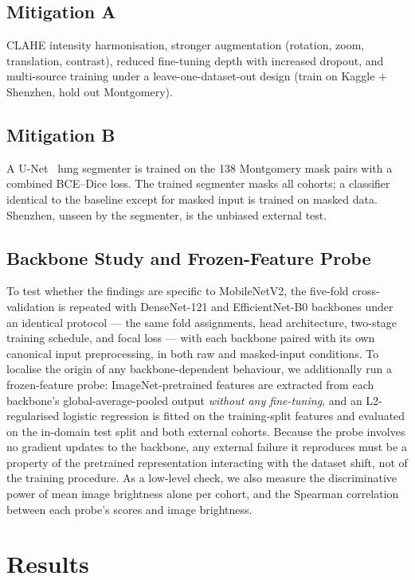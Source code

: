 \documentclass[journal]{IEEEtran}
\begin{document}
\subsection{Mitigation A}
CLAHE intensity harmonisation, stronger augmentation (rotation, zoom,
translation, contrast), reduced fine-tuning depth with increased dropout, and
multi-source training under a leave-one-dataset-out design (train on Kaggle
$+$ Shenzhen, hold out Montgomery).

\subsection{Mitigation B}
A U-Net~\cite{ronneberger2015unet} lung segmenter is trained on the 138
Montgomery mask pairs with a combined BCE--Dice loss. The trained segmenter
masks all cohorts; a classifier identical to the baseline except for masked
input is trained on masked data. Shenzhen, unseen by the segmenter, is the
unbiased external test.

\subsection{Backbone Study and Frozen-Feature Probe}
To test whether the findings are specific to MobileNetV2, the five-fold
cross-validation is repeated with DenseNet-121 and EfficientNet-B0 backbones
under an identical protocol --- the same fold assignments, head architecture,
two-stage training schedule, and focal loss --- with each backbone paired with
its own canonical input preprocessing, in both raw and masked-input conditions.
To localise the origin of any backbone-dependent behaviour, we additionally run
a frozen-feature probe: ImageNet-pretrained features are extracted from each
backbone's global-average-pooled output \emph{without any fine-tuning}, and an
L2-regularised logistic regression is fitted on the training-split features and
evaluated on the in-domain test split and both external cohorts. Because the
probe involves no gradient updates to the backbone, any external failure it
reproduces must be a property of the pretrained representation interacting with
the dataset shift, not of the training procedure. As a low-level check, we also
measure the discriminative power of mean image brightness alone per cohort, and
the Spearman correlation between each probe's scores and image brightness.

\section{Results}
\end{document}
